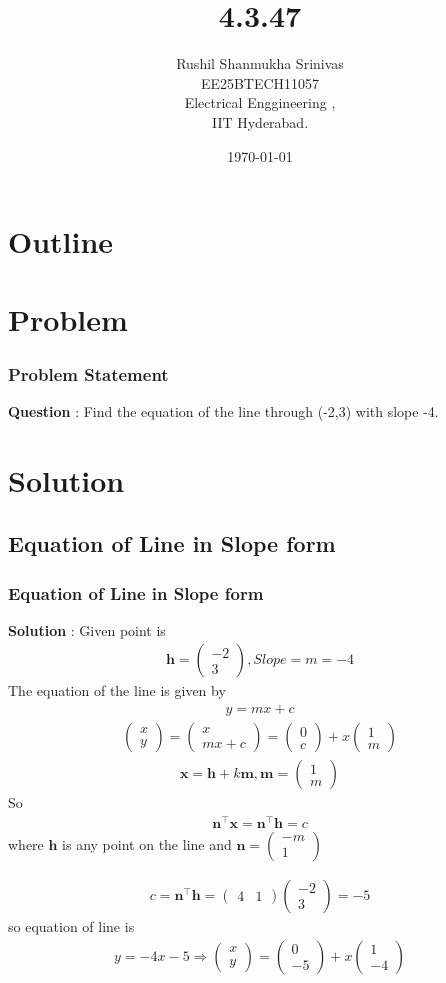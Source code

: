 \documentclass{beamer}
\title{4.3.47}
\author{Rushil Shanmukha Srinivas \\EE25BTECH11057 \\ Electrical Enggineering ,\\IIT Hyderabad.}
\date{\today}
\theoremstyle{remark}
\newcommand{\myvec}[1]{\ensuremath{\begin{pmatrix}#1\end{pmatrix}}}
\let\vec\mathbf
\numberwithin{equation}{section}
\begin{document}
 

\begin{frame}
\titlepage
\end{frame}

\section*{Outline}
\begin{frame}
\tableofcontents
\end{frame}
\section{Problem}
\begin{frame}
\frametitle{Problem Statement}
\textbf{Question} : Find the equation of the line through (-2,3) with slope -4.
\end{frame}
\section{Solution}
\subsection{Equation of Line in Slope form}
\begin{frame}
\frametitle{Equation of Line in Slope form}
\textbf{Solution} :
Given point is 
\begin{align}
\vec{h}=\myvec
{-2\\3} , Slope=m=-4
\end{align}
The equation of the line is given by
\begin{align}
y=mx+c
\end{align}
\begin{align}
\myvec{x\\y} = \myvec{x\\mx+c}=\myvec{0\\c} + x\myvec{1\\m}
\end{align}
\begin{align}
\vec{x}=\vec{h}+k\vec{m} , \vec{m}=\myvec{1\\m}
\end{align}
So
\begin{align}
\vec{n}^\top \vec{x} = \vec{n}^\top \vec{h} =c
\end{align}
 where $\vec{h}$ is any point on the line and $\vec{n}=\myvec{-m\\1} $
\end{frame}
\begin{frame}
\begin{align}
c = \vec{n}^\top \vec{h} = \myvec{4 & 1}\myvec{-2\\3} = -5
\end{align}
so equation of line is 
\begin{align}
y=-4x -5 \Longrightarrow \myvec{x\\y}=\myvec{0\\-5} + x\myvec{1\\-4}
\end{align}
 
\end{frame}
\end{document}

